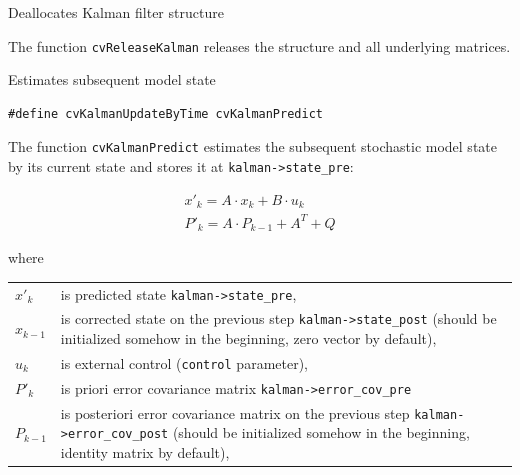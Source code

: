 \label{ReleaseKalman}

Deallocates Kalman filter structure


\begin{description}
\end{description}

The function \texttt{cvReleaseKalman} releases the structure  and all underlying matrices.

\label{KalmanPredict}

Estimates subsequent model state

\begin{lstlisting}
#define cvKalmanUpdateByTime cvKalmanPredict
\end{lstlisting}

\begin{description}
\end{description}

The function \texttt{cvKalmanPredict} estimates the subsequent stochastic model state by its current state and stores it at \texttt{kalman->state\_pre}:

\[
\begin{array}{l}
x'_k=A \cdot x_k+B \cdot u_k\\
P'_k=A \cdot P_{k-1}+A^T + Q
\end{array}
\]

where

\begin{tabular}{l p{5 in}}
$x'_k$ & is predicted state \texttt{kalman->state\_pre},\\
$x_{k-1}$ & is corrected state on the previous step \texttt{kalman->state\_post}
                (should be initialized somehow in the beginning, zero vector by default),\\
$u_k$ & is external control (\texttt{control} parameter),\\
$P'_k$ & is priori error covariance matrix \texttt{kalman->error\_cov\_pre}\\
$P_{k-1}$ & is posteriori error covariance matrix on the previous step \texttt{kalman->error\_cov\_post}
                (should be initialized somehow in the beginning, identity matrix by default),
\end{tabular}

